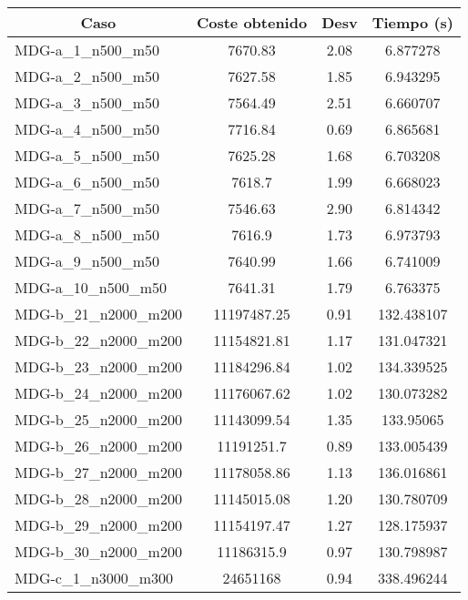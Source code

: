 \documentclass[10pt,a4paper]{article}
\begin{document}
\begin{table}[H]
	\begin{center}
		\begin{tabular}{|l|c|c|c|} 
			\hline
			\multicolumn{1}{|c|}{\textbf{Caso}} & \textbf{Coste obtenido} & \textbf{Desv} & \textbf{Tiempo (s)} \\ \hline
			\hline
					MDG-a\_1\_n500\_m50 & 7670.83 & 2.08 & 6.877278 \\ \hline
					MDG-a\_2\_n500\_m50 & 7627.58 & 1.85 & 6.943295 \\ \hline
					MDG-a\_3\_n500\_m50 & 7564.49 & 2.51 & 6.660707 \\ \hline
					MDG-a\_4\_n500\_m50 & 7716.84 & 0.69 & 6.865681 \\ \hline
					MDG-a\_5\_n500\_m50 & 7625.28 & 1.68 & 6.703208 \\ \hline
					MDG-a\_6\_n500\_m50 & 7618.7 & 1.99 & 6.668023 \\ \hline
					MDG-a\_7\_n500\_m50 & 7546.63 & 2.90 & 6.814342 \\ \hline
					MDG-a\_8\_n500\_m50 & 7616.9 & 1.73 & 6.973793 \\ \hline
					MDG-a\_9\_n500\_m50 & 7640.99 & 1.66 & 6.741009 \\ \hline
					MDG-a\_10\_n500\_m50 & 7641.31 & 1.79 & 6.763375 \\ \hline
					MDG-b\_21\_n2000\_m200 & 11197487.25 & 0.91 & 132.438107 \\ \hline
					MDG-b\_22\_n2000\_m200 & 11154821.81 & 1.17 & 131.047321 \\ \hline
					MDG-b\_23\_n2000\_m200 & 11184296.84 & 1.02 & 134.339525 \\ \hline
					MDG-b\_24\_n2000\_m200 & 11176067.62 & 1.02 & 130.073282 \\ \hline
					MDG-b\_25\_n2000\_m200 & 11143099.54 & 1.35 & 133.95065 \\ \hline
					MDG-b\_26\_n2000\_m200 & 11191251.7 & 0.89 & 133.005439 \\ \hline
					MDG-b\_27\_n2000\_m200 & 11178058.86 & 1.13 & 136.016861 \\ \hline
					MDG-b\_28\_n2000\_m200 & 11145015.08 & 1.20 & 130.780709 \\ \hline
					MDG-b\_29\_n2000\_m200 & 11154197.47 & 1.27 & 128.175937 \\ \hline
					MDG-b\_30\_n2000\_m200 & 11186315.9 & 0.97 & 130.798987 \\ \hline
					MDG-c\_1\_n3000\_m300 & 24651168 & 0.94 & 338.496244 \\ \hline

\end{tabular}
\end{center}
\end{table}
\end{document}
